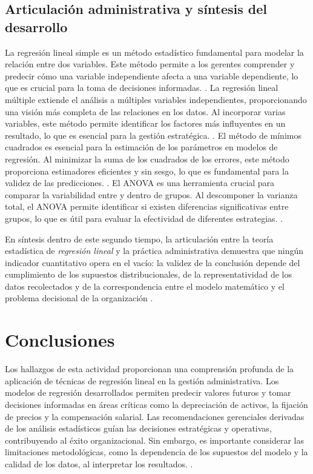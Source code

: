 {\subsection{Articulación administrativa y síntesis del desarrollo}
La regresión lineal simple es un método estadístico fundamental para modelar la relación entre dos variables. Este método permite a los gerentes comprender y predecir cómo una variable independiente afecta a una variable dependiente, lo que es crucial para la toma de decisiones informadas. \citep{holmesBusiness2023,nistHandbook}.
La regresión lineal múltiple extiende el análisis a múltiples variables independientes, proporcionando una visión más completa de las relaciones en los datos. Al incorporar varias variables, este método permite identificar los factores más influyentes en un resultado, lo que es esencial para la gestión estratégica. \citep{holmesBusiness2023,nistHandbook}.
El método de mínimos cuadrados es esencial para la estimación de los parámetros en modelos de regresión. Al minimizar la suma de los cuadrados de los errores, este método proporciona estimadores eficientes y sin sesgo, lo que es fundamental para la validez de las predicciones. \citep{holmesBusiness2023,nistHandbook}.
El ANOVA es una herramienta crucial para comparar la variabilidad entre y dentro de grupos. Al descomponer la varianza total, el ANOVA permite identificar si existen diferencias significativas entre grupos, lo que es útil para evaluar la efectividad de diferentes estrategias. \citep{holmesBusiness2023,nistHandbook}.

En síntesis dentro de este segundo tiempo, la articulación entre la teoría estadística de \textit{regresión lineal} y la práctica administrativa demuestra que ningún indicador cuantitativo opera en el vacío: la validez de la conclusión depende del cumplimiento de los supuestos distribucionales, de la representatividad de los datos recolectados y de la correspondencia entre el modelo matemático y el problema decisional de la organización \citep{anderson2012,nistHandbook,guarin2002}.

\clearpage
\section{Conclusiones}
Los hallazgos de esta actividad proporcionan una comprensión profunda de la aplicación de técnicas de regresión lineal en la gestión administrativa. Los modelos de regresión desarrollados permiten predecir valores futuros y tomar decisiones informadas en áreas críticas como la depreciación de activos, la fijación de precios y la compensación salarial. Las recomendaciones gerenciales derivadas de los análisis estadísticos guían las decisiones estratégicas y operativas, contribuyendo al éxito organizacional. Sin embargo, es importante considerar las limitaciones metodológicas, como la dependencia de los supuestos del modelo y la calidad de los datos, al interpretar los resultados. \citep{anderson2012,lind2012,wackerly2010,diazRodriguez2022}.
}

